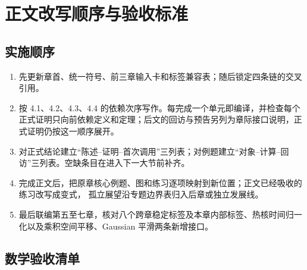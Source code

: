 \documentclass[11pt,a4paper]{ctexart}
\begin{document}
\section{正文改写顺序与验收标准}

\subsection{实施顺序}

\begin{enumerate}
\item 先更新章首、统一符号、前三章输入卡和标签兼容表；随后锁定四条链的交叉引用。
\item 按 4.1、4.2、4.3、4.4 的依赖次序写作。每完成一个单元即编译，并检查每个正式证明只向前依赖定义和定理；后文的回访与预告另列为章际接口说明，正式证明仍按这一顺序展开。
\item 对正式结论建立“陈述--证明--首次调用”三列表；对例题建立“对象--计算--回访”三列表。空缺条目在进入下一大节前补齐。
\item 完成正文后，把原章核心例题、图和练习逐项映射到新位置；正文已经吸收的练习改写成变式，
      孤立展望沿专题边界表归入后章或独立发展线。
\item 最后联编第五至七章，核对八个跨章稳定标签及本章内部标签、热核时间归一化以及乘积空间平移、Gaussian 平滑两条新增接口。
\end{enumerate}

\subsection{数学验收清单}
\end{document}

